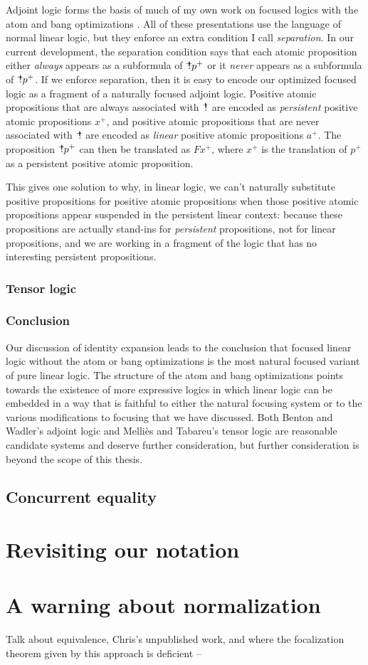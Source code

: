 Adjoint logic forms the basis of much of my own work on focused logics
with the atom and bang optimizations
\cite{pfenning09substructural,simmons09weak,simmons11logical}. All of
these presentations use the language of normal linear logic, but they
enforce an extra condition I call {\it separation}. In our current
development, the separation condition says that each atomic
proposition either {\it always} appears as a subformula of
${\mbox{\hspace{2pt}$\mathbb !$\hspace{-5pt}$^+$\hspace{-1pt}}}p^+$ or it {\it never} appears as a subformula of
${\mbox{\hspace{2pt}$\mathbb !$\hspace{-5pt}$^+$\hspace{-1pt}}}p^+$. If we enforce separation, then it is easy to encode our
optimized focused logic as a fragment of a naturally focused adjoint
logic. Positive atomic propositions that are always associated with
${\mbox{\hspace{2pt}$\mathbb !$\hspace{-5pt}$^+$\hspace{-1pt}}}$ are encoded as {\it persistent} positive atomic
propositions $x^+$, and positive atomic propositions that are never
associated with ${\mbox{\hspace{2pt}$\mathbb !$\hspace{-5pt}$^+$\hspace{-1pt}}}$ are encoded as {\it linear} positive atomic
propositions $a^+$. The proposition ${\mbox{\hspace{2pt}$\mathbb !$\hspace{-5pt}$^+$\hspace{-1pt}}}p^+$ can then be
translated as $F x^+$, where $x^+$ is the translation of $p^+$ as a
persistent positive atomic proposition.

This gives one solution to why, in linear logic, we can't naturally
substitute positive propositions for positive atomic propositions when
those positive atomic propositions appear suspended in the persistent
linear context: because these propositions are actually stand-ins for
{\it persistent} propositions, not for linear propositions, and we are
working in a fragment of the logic that has no interesting persistent
propositions.

\subsubsection*{Tensor logic}

\subsubsection*{Conclusion}

Our discussion of identity expansion leads to the conclusion that
focused linear logic without the atom or bang optimizations is the
most natural focused variant of pure linear logic. The structure of
the atom and bang optimizations points towards the existence of more
expressive logics in which linear logic can be embedded in a way that
is faithful to either the natural focusing system or to the various
modifications to focusing that we have discussed. Both Benton and
Wadler's adjoint logic and Melli{\`e}s and Tabareu's tensor logic are
reasonable candidate systems and deserve further consideration, but
further consideration is beyond the scope of this thesis.

\subsection{Concurrent equality}

\section{Revisiting our notation}
\label{sec:linnote}

\section{A warning about normalization}
\label{sec:warning}

Talk about equivalence, Chris's unpublished work, and where
the focalization theorem given by this approach is deficient -- 